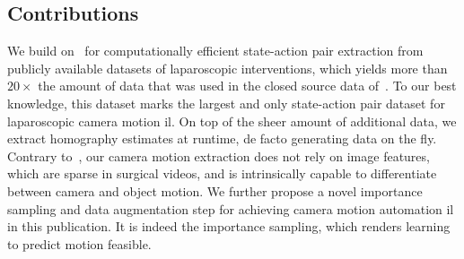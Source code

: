 \subsection{Contributions}
We build on~\cite{huber2022deep} for computationally efficient state-action pair extraction from publicly available datasets of laparoscopic interventions, which yields more than $20\times$ the amount of data that was used in the closed source data of~\cite{li2022learning}. To our best knowledge, this dataset marks the largest and only state-action pair dataset for laparoscopic camera motion \gls{il}. On top of the sheer amount of additional data, we extract homography estimates at runtime, de facto generating data on the fly. Contrary to~\cite{li2022learning}, our camera motion extraction does not rely on image features, which are sparse in surgical videos, and is intrinsically capable to differentiate between camera and object motion. We further propose a novel importance sampling and data augmentation step for achieving camera motion automation \gls{il} in this publication. It is indeed the importance sampling, which renders learning to predict motion feasible.









